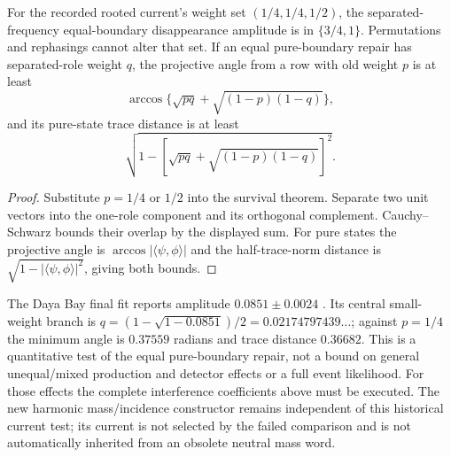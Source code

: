 \documentclass[12pt,a4paper]{article}
\begin{document}
\begin{corollary}
\label{p5c:cor:v2210-lit-reactor-obstruction}
For the recorded rooted current's weight set \((1/4,1/4,1/2)\), the
separated-frequency equal-boundary disappearance amplitude is in
\(\{3/4,1\}\).  Permutations and rephasings cannot alter that set.
If an equal pure-boundary repair has separated-role weight \(q\), the
projective angle from a row with old weight \(p\) is at least
\[
 \arccos\{\sqrt{pq}+\sqrt{(1-p)(1-q)}\},
\]
and its pure-state trace distance is at least
\[
 \boxed{\sqrt{1-[\sqrt{pq}+\sqrt{(1-p)(1-q)}]^2}.}
\]
\end{corollary}
\begin{proof}
Substitute \(p=1/4\) or \(1/2\) into the survival theorem.  Separate two
unit vectors into the one-role component and its orthogonal complement.
Cauchy--Schwarz bounds their overlap by the displayed sum.  For pure states
the projective angle is \(\arccos|\langle\psi,\phi\rangle|\) and the
half-trace-norm distance is
\(\sqrt{1-|\langle\psi,\phi\rangle|^2}\), giving both bounds.
\end{proof}
The Daya Bay final fit reports amplitude \(0.0851\pm0.0024\)
\cite{DayaBayFinal2023}.  Its central small-weight branch is
\(q=(1-\sqrt{1-0.0851})/2=0.02174797439\ldots\); against \(p=1/4\)
the minimum angle is \(0.37559\) radians and trace distance \(0.36682\).
This is a quantitative test of the equal pure-boundary repair, not a bound
on general unequal/mixed production and detector effects or a full event
likelihood.  For those effects the complete interference coefficients above
must be executed.  The new harmonic mass/incidence constructor remains
independent of this historical current test; its current is not selected by
the failed comparison and is not automatically inherited from an obsolete
neutral mass word.
\end{document}
